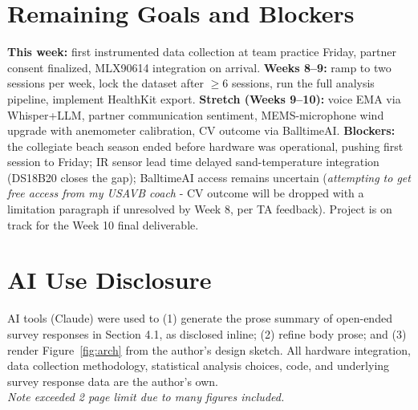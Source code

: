 \documentclass[sigconf,nonacm]{acmart}
\begin{document}
\section{Remaining Goals and Blockers}

\textbf{This week:} first instrumented data collection at team practice Friday, partner consent finalized, MLX90614 integration on arrival. \textbf{Weeks 8--9:} ramp to two sessions per week, lock the dataset after $\geq 6$ sessions, run the full analysis pipeline, implement HealthKit export. \textbf{Stretch (Weeks 9--10):} voice EMA via Whisper+LLM, partner communication sentiment, MEMS-microphone wind upgrade with anemometer calibration, CV outcome via BalltimeAI. \textbf{Blockers:} the collegiate beach season ended before hardware was operational, pushing first session to Friday; IR sensor lead time delayed sand-temperature integration (DS18B20 closes the gap); BalltimeAI access remains uncertain (\textit{attempting to get free access from my USAVB coach} - CV outcome will be dropped with a limitation paragraph if unresolved by Week 8, per TA feedback). Project is on track for the Week 10 final deliverable.

\section{AI Use Disclosure}

AI tools (Claude) were used to (1) generate the prose summary of open-ended survey responses in Section 4.1, as disclosed inline; (2) refine body prose; and (3) render Figure~\ref{fig:arch} from the author's design sketch. All hardware integration, data collection methodology, statistical analysis choices, code, and underlying survey response data are the author's own.\\

\textit{Note exceeded 2 page limit due to many figures included.}
\end{document}
